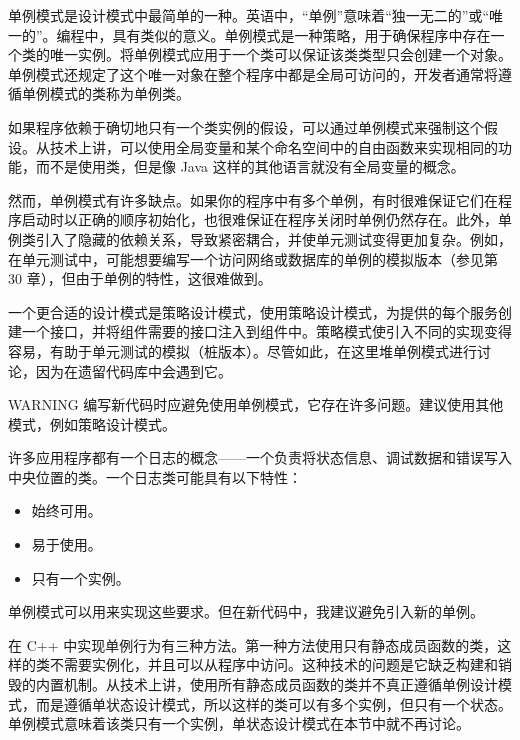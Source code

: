 
单例模式是设计模式中最简单的一种。英语中，“单例”意味着“独一无二的”或“唯一的”。编程中，具有类似的意义。单例模式是一种策略，用于确保程序中存在一个类的唯一实例。将单例模式应用于一个类可以保证该类类型只会创建一个对象。单例模式还规定了这个唯一对象在整个程序中都是全局可访问的，开发者通常将遵循单例模式的类称为单例类。

如果程序依赖于确切地只有一个类实例的假设，可以通过单例模式来强制这个假设。从技术上讲，可以使用全局变量和某个命名空间中的自由函数来实现相同的功能，而不是使用类，但是像 Java 这样的其他语言就没有全局变量的概念。

然而，单例模式有许多缺点。如果你的程序中有多个单例，有时很难保证它们在程序启动时以正确的顺序初始化，也很难保证在程序关闭时单例仍然存在。此外，单例类引入了隐藏的依赖关系，导致紧密耦合，并使单元测试变得更加复杂。例如，在单元测试中，可能想要编写一个访问网络或数据库的单例的模拟版本（参见第 30 章），但由于单例的特性，这很难做到。

一个更合适的设计模式是策略设计模式，使用策略设计模式，为提供的每个服务创建一个接口，并将组件需要的接口注入到组件中。策略模式使引入不同的实现变得容易，有助于单元测试的模拟（桩版本）。尽管如此，在这里堆单例模式进行讨论，因为在遗留代码库中会遇到它。

\begin{myWarning}{WARNING}
编写新代码时应避免使用单例模式，它存在许多问题。建议使用其他模式，例如策略设计模式。
\end{myWarning}


许多应用程序都有一个日志的概念——一个负责将状态信息、调试数据和错误写入中央位置的类。一个日志类可能具有以下特性：

\begin{itemize}
\item
始终可用。

\item
易于使用。

\item
只有一个实例。
\end{itemize}

单例模式可以用来实现这些要求。但在新代码中，我建议避免引入新的单例。


在 C++ 中实现单例行为有三种方法。第一种方法使用只有静态成员函数的类，这样的类不需要实例化，并且可以从程序中访问。这种技术的问题是它缺乏构建和销毁的内置机制。从技术上讲，使用所有静态成员函数的类并不真正遵循单例设计模式，而是遵循单状态设计模式，所以这样的类可以有多个实例，但只有一个状态。单例模式意味着该类只有一个实例，单状态设计模式在本节中就不再讨论。

